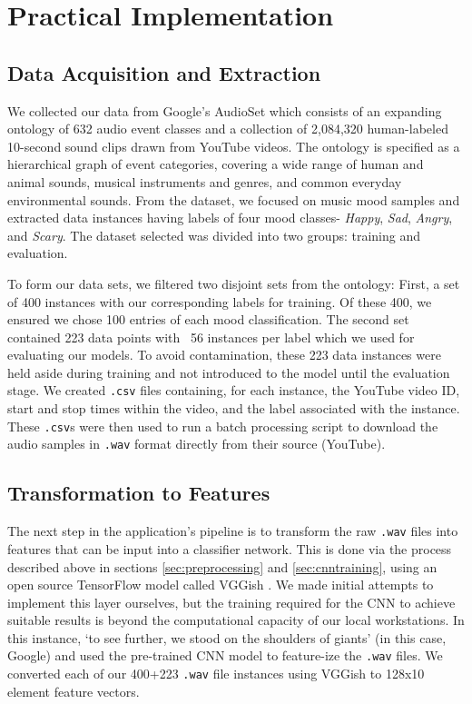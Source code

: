 \documentclass{article}
\begin{document}
\section{Practical Implementation}

\subsection{Data Acquisition and Extraction}

We collected our data from Google’s AudioSet \cite{audioset} which consists of an expanding ontology of 632 audio event classes and a collection of 2,084,320 human-labeled 10-second sound clips drawn from YouTube videos. The ontology is specified as a hierarchical graph of event categories, covering a wide range of human and animal sounds, musical instruments and genres, and common everyday environmental sounds. From the dataset, we focused on music mood samples and extracted data instances having labels of four mood classes- \textit{Happy}, \textit{Sad}, \textit{Angry}, and \textit{Scary}. The dataset selected was divided into two groups: training and evaluation. 

To form our data sets, we filtered two disjoint sets from the ontology: First, a set of 400 instances with our corresponding labels for training. Of these 400, we ensured we chose 100 entries of each mood classification. The second set contained 223 data points with ~56 instances per label which we used for evaluating our models. To avoid contamination, these 223 data instances were held aside during training and not introduced to the model until the evaluation stage. We created \texttt{.csv} files containing, for each instance, the YouTube video ID, start and stop times within the video, and the label associated with the instance. These \texttt{.csv}s were then used to run a batch processing script to download the audio samples in \texttt{.wav} format directly from their source (YouTube).

\subsection{Transformation to Features}
The next step in the application’s pipeline is to transform the raw \texttt{.wav} files into features that can be input into a classifier network. This is done via the process described above in sections \ref{sec:preprocessing} and \ref{sec:cnntraining}, using an open source TensorFlow model called VGGish \cite{vggish}. We made initial attempts to implement this layer ourselves, but the training required for the CNN to achieve suitable results is beyond the computational capacity of our local workstations. In this instance, `to see further, we stood on the shoulders of giants\cite{newton}’ (in this case, Google) and used the pre-trained CNN model to feature-ize the \texttt{.wav} files. We converted each of our 400+223 \texttt{.wav} file instances using VGGish to 128x10 element feature vectors.
\end{document}
